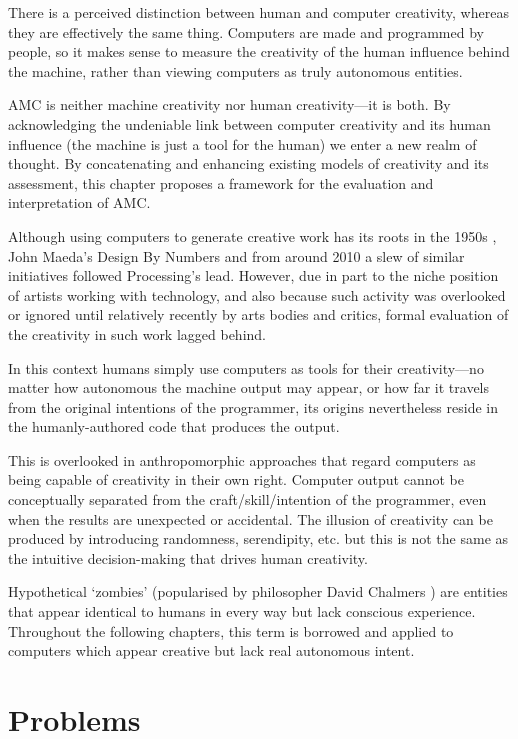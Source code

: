 There is a perceived distinction between human and computer creativity, whereas they are effectively the same thing. Computers are made and programmed by people, so it makes sense to measure the creativity of the human influence behind the machine, rather than viewing computers as truly autonomous entities.

\acf{AMC} is neither machine creativity nor human creativity---it is both. By acknowledging the undeniable link between computer creativity and its human influence (the machine is just a tool for the human) we enter a new realm of thought. By concatenating and enhancing existing models of creativity and its assessment, this chapter proposes a framework for the evaluation and interpretation of \ac{AMC}.

\spirals

Although using computers to generate creative work has its roots in the 1950s \autocite{Candy2011, Copeland2016}, John Maeda's Design By Numbers \autocite*{Maeda2001} and from around 2010 a slew of similar initiatives followed Processing's lead. However, due in part to the niche position of artists working with technology, and also because such activity was overlooked or ignored until relatively recently by arts bodies and critics, formal evaluation of the creativity in such work lagged behind.

In this context humans simply use computers as tools for their creativity---no matter how autonomous the machine output may appear, or how far it travels from the original intentions of the programmer, its origins nevertheless reside in the humanly-authored code that produces the output.

This is overlooked in anthropomorphic approaches that regard computers as being capable of creativity in their own right. Computer output cannot be conceptually separated from the craft/skill/intention of the programmer, even when the results are unexpected or accidental. The illusion of creativity can be produced by introducing randomness, serendipity, etc. but this is not the same as the intuitive decision-making that drives human creativity.

Hypothetical `zombies' (popularised by philosopher David Chalmers \autocite*{Chalmers1996}) are entities that appear identical to humans in every way but lack conscious experience. Throughout the following chapters, this term is borrowed and applied to computers which appear creative but lack real autonomous intent.


\section{Problems}


